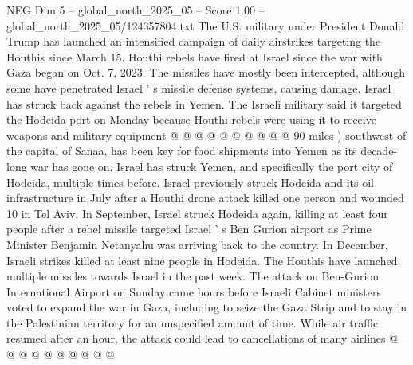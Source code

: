 \begin{textsample}{NEG Dim 5 – global\_north\_2025\_05 – Score 1.00 – global\_north\_2025\_05/124357804.txt}
The U.S. military under President Donald Trump has launched an intensified campaign of daily airstrikes targeting the Houthis since March 15.
Houthi rebels have fired at Israel since the war with Gaza began on Oct. 7, 2023.
The missiles have mostly been intercepted, although some have penetrated Israel ' s missile defense systems, causing damage.
Israel has struck back against the rebels in Yemen.
The Israeli military said it targeted the Hodeida port on Monday because Houthi rebels were using it to receive weapons and military equipment @ @ @ @ @ @ @ @ @ @ 90 miles ) southwest of the capital of Sanaa, has been key for food shipments into Yemen as its decade-long war has gone on.
Israel has struck Yemen, and specifically the port city of Hodeida, multiple times before.
Israel previously struck Hodeida and its oil infrastructure in July after a Houthi drone attack killed one person and wounded 10 in Tel Aviv.
In September, Israel struck Hodeida again, killing at least four people after a rebel missile targeted Israel ' s Ben Gurion airport as Prime Minister Benjamin Netanyahu was arriving back to the country.
In December, Israeli strikes killed at least nine people in Hodeida.
The Houthis have launched multiple missiles towards Israel in the past week.
The attack on Ben-Gurion International Airport on Sunday came hours before Israeli Cabinet ministers voted to expand the war in Gaza, including to seize the Gaza Strip and to stay in the Palestinian territory for an unspecified amount of time.
While air traffic resumed after an hour, the attack could lead to cancellations of many airlines @ @ @ @ @ @ @ @ @ @

\end{textsample}
